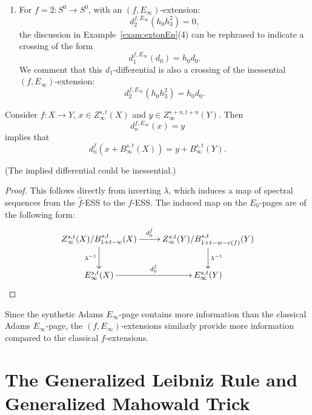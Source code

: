 \documentclass{amsart}
\numberwithin{equation}{section}
\begin{document}
\begin{example}
\begin{enumerate}
        \item For $f = 2: S^0 \rightarrow S^0$, with an $(f, E_\infty)$-extension:
        $$d_2^{f, E_\infty} (h_0 h_3^2) = 0,$$
        the discussion in Example~\ref{exam:extonEn}(4) can be rephrased to indicate a crossing of the form
        $$d_1^{f, E_\infty} (d_0) = h_0 d_0.$$
        We comment that this $d_1$-differential is also a crossing of the inessential $(f, E_\infty)$-extension:
        $$d_2^{f, E_\infty} (h_0 h_3^2) = h_0 d_0.$$
    \end{enumerate}
\end{example}

\begin{proposition}
    Consider $f: X\to Y$, $x\in Z_\infty^{s,t}(X)$ and $y\in Z_\infty^{s+n,t+n}(Y)$.
    Then
    $$d^{f,E_\infty}_n(x)=y$$
    implies that
    $$d^{f}_n(x+B_\infty^{s,t}(X))=y+B_\infty^{s,t}(Y).$$
\end{proposition}
(The implied differential could be inessential.)
\begin{proof}
  This follows directly from inverting $\lambda$, which induces a map of spectral sequences from the $\hat f$-ESS to the $f$-ESS. The induced map on the $E_0$-pages are of the following form:
    $$\xymatrix{
    Z_\infty^{s,t}(X)/B_{1+t-w}^{s,t}(X)\ar[r]^-{d^{\hat f}_0}\ar[d]_{\lambda^{-1}} & Z_\infty^{s,t}(Y)/B_{1+t-w-e(f)}^{s,t}(Y)\ar[d]^{\lambda^{-1}}\\
    E_\infty^{s,t}(X)\ar[r]^-{d^{f}_0} & E_\infty^{s, t}(Y)
    }$$
\end{proof}
\begin{remark}
    Since the synthetic Adams $E_\infty$-page contains more information than the classical Adams $E_\infty$-page, the $(f,E_\infty)$-extensions similarly provide more information compared to the classical $f$-extensions.
\end{remark}

\section{The Generalized Leibniz Rule and Generalized Mahowald Trick} \label{sec:rules}
\end{document}
